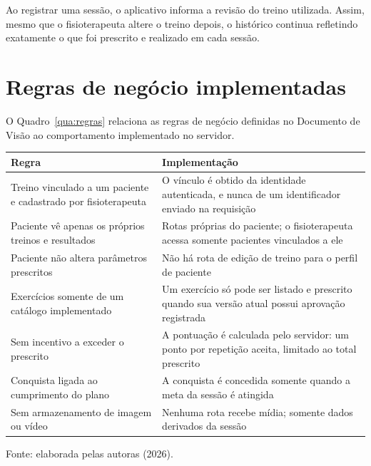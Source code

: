 Ao registrar uma sessão, o aplicativo informa a revisão do treino utilizada. Assim, mesmo que o fisioterapeuta altere o treino depois, o histórico continua refletindo exatamente o que foi prescrito e realizado em cada sessão.

\section{Regras de negócio implementadas}
\label{sec:regras-implementadas}

O Quadro~\ref{qua:regras} relaciona as regras de negócio definidas no Documento de Visão ao comportamento implementado no servidor.

\begin{quadro}[htbp]
    \centering
    \caption{Regras de negócio e implementação no servidor}
    \label{qua:regras}
    \begin{tabular}{|p{5.5cm}|p{8.5cm}|}
        \hline
        \textbf{Regra} & \textbf{Implementação} \\ \hline
        Treino vinculado a um paciente e cadastrado por fisioterapeuta & O vínculo é obtido da identidade autenticada, e nunca de um identificador enviado na requisição \\ \hline
        Paciente vê apenas os próprios treinos e resultados & Rotas próprias do paciente; o fisioterapeuta acessa somente pacientes vinculados a ele \\ \hline
        Paciente não altera parâmetros prescritos & Não há rota de edição de treino para o perfil de paciente \\ \hline
        Exercícios somente de um catálogo implementado & Um exercício só pode ser listado e prescrito quando sua versão atual possui aprovação registrada \\ \hline
        Sem incentivo a exceder o prescrito & A pontuação é calculada pelo servidor: um ponto por repetição aceita, limitado ao total prescrito \\ \hline
        Conquista ligada ao cumprimento do plano & A conquista é concedida somente quando a meta da sessão é atingida \\ \hline
        Sem armazenamento de imagem ou vídeo & Nenhuma rota recebe mídia; somente dados derivados da sessão \\ \hline
    \end{tabular}
    \par\medskip
    Fonte: elaborada pelas autoras (2026).
\end{quadro}


